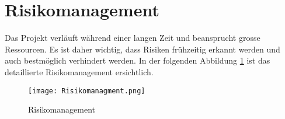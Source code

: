 \section{Risikomanagement}

Das Projekt verläuft während einer langen Zeit und beansprucht grosse Ressourcen. Es ist daher wichtig, dass Risiken frühzeitig erkannt werden und auch bestmöglich verhindert werden. In der folgenden Abbildung \ref{fig::Risikomanagement} ist das detaillierte Risikomanagement ersichtlich.


\begin{figure}[h] 
\centering
\texttt{[image: Risikomanagment.png]}%
\caption{Risikomanagement}%
\label{fig::Risikomanagement}%
\end{figure}